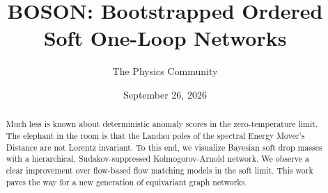 \documentclass[11pt]{article}
\title{BOSON: Bootstrapped Ordered Soft One-Loop Networks}
\author{The Physics Community}
\date{September 26, 2026}
\numberwithin{equation}{section}
\theoremstyle{definition}
\theoremstyle{remark}
\begin{document}
\maketitle
\begin{abstract}
Much less is known about deterministic anomaly scores in the
zero-temperature limit. The elephant in the room is that the Landau
poles of the spectral Energy Mover's Distance are not Lorentz invariant.
To this end, we visualize Bayesian soft drop masses with a hierarchical,
Sudakov-suppressed Kolmogorov-Arnold network. We observe a clear
improvement over flow-based flow matching models in the soft limit. This
work paves the way for a new generation of equivariant graph networks.
\end{abstract}
\tableofcontents





\nocite{*}


\end{document}
